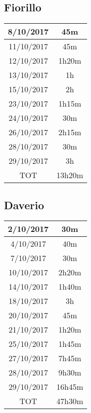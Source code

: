 
\subsection{Fiorillo}

\begin{tabular}{|c|c|}
	\hline
8/10/2017	& 45m \\ 
	\hline 
11/10/2017	& 45m \\ 
	\hline 
12/10/2017	& 1h20m \\ 
	\hline 
13/10/2017	& 1h \\ 
	\hline 
15/10/2017	& 2h \\ 
	\hline 
23/10/2017	& 1h15m \\ 
	\hline 
24/10/2017	& 30m \\ 
	\hline 
26/10/2017	& 2h15m \\ 
	\hline 
28/10/2017	& 30m \\ 
	\hline
29/10/2017	& 3h \\ 
	\hline
TOT			& 13h20m \\

\end{tabular} 

\subsection{Daverio}

\begin{tabular}{|c|c|}
	\hline
	2/10/2017	& 30m \\ 
	\hline 
	4/10/2017	& 40m \\ 
	\hline 
	7/10/2017	& 30m \\ 
	\hline 
	10/10/2017	& 2h20m \\ 
	\hline 
	14/10/2017	& 1h40m \\ 
	\hline 
	18/10/2017	& 3h \\ 
	\hline 
	20/10/2017	& 45m \\ 
	\hline 
	21/10/2017	& 1h20m \\ 
	\hline 
	25/10/2017	& 1h45m \\ 
	\hline 
	27/10/2017	& 7h45m \\ 
	\hline 
	28/10/2017	& 9h30m \\ 
	\hline
	29/10/2017	& 16h45m \\ 
	\hline
	TOT			& 47h30m \\

\end{tabular}